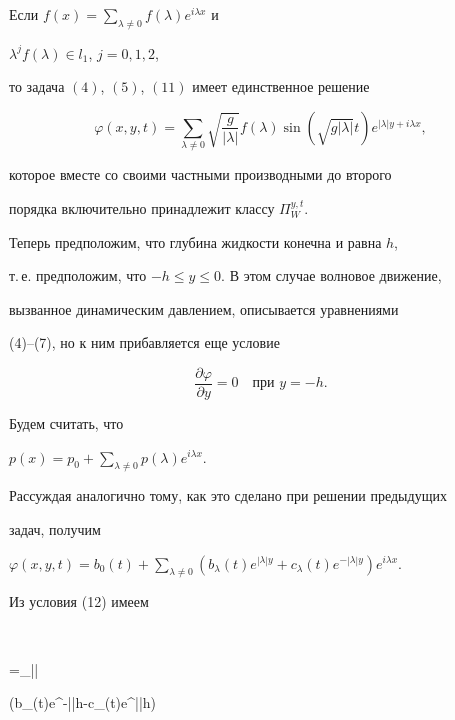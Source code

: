 \begin{thm} 


Если $f(x)=\sum\limits_{\lambda\ne0}f(\lambda)e^{i\lambda x}$ и 


$\lambda^j f(\lambda)\in l_1$, $j=0,1,2$, 


то задача $(4)$, $(5)$, $(11)$ имеет единственное решение 


$$ 


\varphi(x,y,t)=\sum_{\lambda\ne0}\sqrt{\frac{g}{|\lambda|}} 


f(\lambda)\sin(\sqrt{g|\lambda|}t)e^{|\lambda|y+i\lambda x}, 


$$ 


которое вместе со своими частными производными до второго 


порядка включительно принадлежит классу $\Pi^{y,t}_W$. 


\end{thm} 


 


Теперь предположим, что глубина жидкости конечна и равна $h$, 


т.\,е. предположим, что $-h\le y\le0$. В этом случае волновое движение, 


вызванное динамическим давлением, описывается уравнениями 


(4)--(7), но к ним прибавляется еще условие 


\begin{equation} 


\frac{\partial\varphi}{\partial y}=0\quad 


\text{при $y=-h$}. 


\end{equation} 


Будем считать, что 


$p(x)=p_0+\sum\limits_{\lambda\ne0}p(\lambda)e^{i\lambda x}$. 


Рассуждая аналогично тому, как это сделано при решении предыдущих 


задач, получим 


$\varphi(x,y,t)=b_0(t)+\sum\limits_{\lambda\ne0} 


(b_\lambda(t)e^{|\lambda|y} +c_\lambda(t)e^{-|\lambda|y}) e^{i\lambda x}$. 


Из условия (12) имеем 


$$ 


=\sum_{\lambda{}}|\lambda| 


(b_\lambda(t)e^{-|\lambda|h}-c_\lambda(t)e^{|\lambda|h}) 


